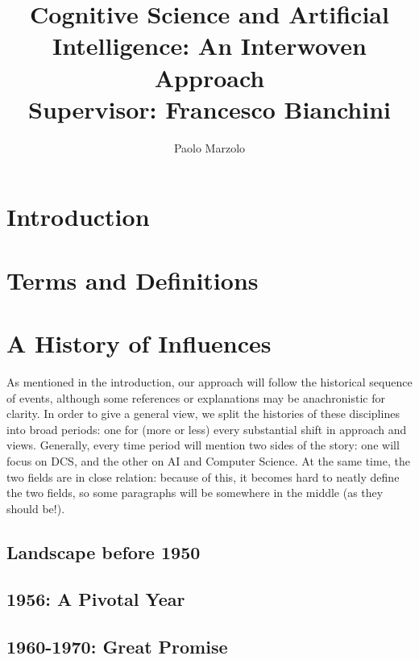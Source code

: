 \documentclass[oneside,notitlepage]{report}
\title{Cognitive Science and Artificial Intelligence: An Interwoven Approach \\
\large Supervisor: Francesco Bianchini}
\author{Paolo Marzolo}
\begin{document}
\begin{titlingpage}
    \maketitle
    \begin{abstract}
        
    \end{abstract}
\end{titlingpage}

\tableofcontents
\newpage

\chapter{Introduction}


\chapter{Terms and Definitions}


\chapter{A History of Influences}
As mentioned in the introduction, our approach will follow the historical sequence of events, although some references or explanations may be anachronistic for clarity. In order to give a general view, we split the histories of these disciplines into broad periods: one for (more or less) every substantial shift in approach and views. Generally, every time period will mention two sides of the story: one will focus on DCS, and the other on AI and Computer Science. At the same time, the two fields are in close relation: because of this, it becomes hard to neatly define the two fields, so some paragraphs will be somewhere in the middle (as they should be!).

\section{Landscape before 1950}


\section{1956: A Pivotal Year}


\section{1960-1970: Great Promise}

\end{document}
